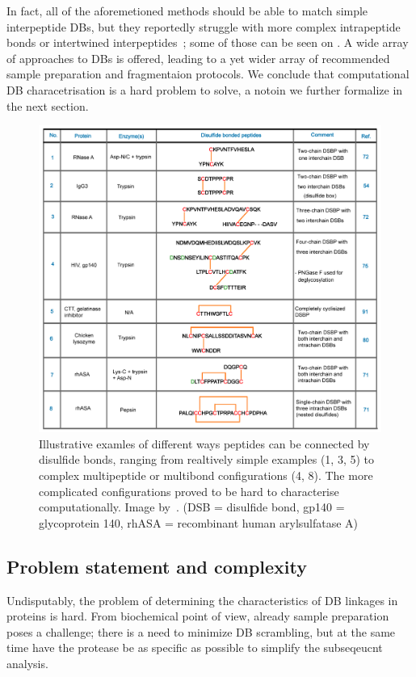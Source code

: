 In fact, all of the aforemetioned methods should be able to match simple interpeptide DBs, but they reportedly struggle with more complex intrapeptide bonds or intertwined interpeptides~\cite{lakbub2018recent}; some of those can be seen on . A wide array of approaches to DBs is offered, leading to a yet wider array of recommended sample preparation and fragmentaion protocols. We conclude that computational DB characetrisation is a hard problem to solve, a notoin we further formalize in the next section.

\begin{figure}
  \centering
  \includegraphics[width=1\linewidth]{img/bond-types.png}
  \caption{Illustrative examles of different ways peptides can be connected by disulfide bonds, ranging from realtively simple examples (1, 3, 5) to complex multipeptide or multibond configurations (4, 8). The more complicated configurations proved to be hard to characterise computationally. Image by~\citet{lakbub2018recent}. (DSB = disulfide bond, gp140 = glycoprotein 140, rhASA = recombinant human arylsulfatase A)}\label{fig:bond-types}
\end{figure}


\subsection{Problem statement and complexity}

Undisputably, the problem of determining the characteristics of DB linkages in proteins is hard. From biochemical point of view, already sample preparation poses a challenge; there is a need to minimize DB scrambling, but at the same time have the protease be as specific as possible to simplify the subseqeucnt analysis.

